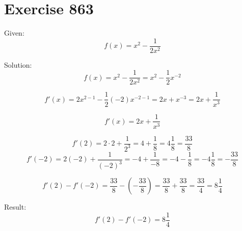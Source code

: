 \documentclass[a4paper, 10pt]{scrartcl}
\begin{document}
\section{Exercise 863}

Given:
\[
f(x) = x^{2} - \frac{1}{2x^{2}}
\]

Solution:
\[
f(x) = x^{2} - \frac{1}{2x^{2}} = x^{2} - \frac{1}{2}x^{-2}
\]

\[
f'(x) = 2x^{2 - 1} - \frac{1}{2}(-2)x^{-2 - 1} = 2x + x^{-3} = 2x + \frac{1}{x^{3}}
\]

\[
f'(x) = 2x + \frac{1}{x^{3}}
\]

\[
f'(2) = 2\cdot2 + \frac{1}{2^{3}} = 4 + \frac{1}{8} = 4\frac{1}{8} = \frac{33}{8}
\]
\[
f'(-2) = 2(-2) + \frac{1}{(-2)^{3}} = -4 + \frac{1}{-8} = -4 - \frac{1}{8} = -4\frac{1}{8} = -\frac{33}{8}
\]

\[
f'(2) - f'(-2) = \frac{33}{8} - (-\frac{33}{8}) = \frac{33}{8} + \frac{33}{8} = \frac{33}{4} = 8\frac{1}{4}
\]

Result:
\[
f'(2) - f'(-2) = 8\frac{1}{4}
\]
\end{document}
